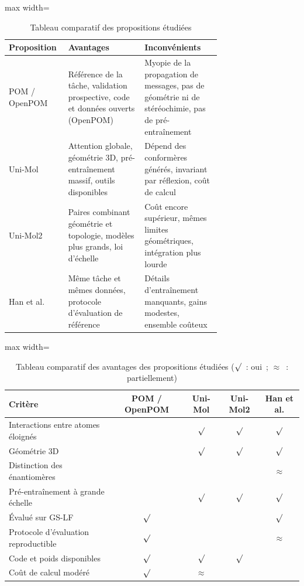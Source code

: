 \begin{table}
   \centering
   \begin{adjustbox}{max width=\linewidth}
   \begin{tabular}{|l||p{0.36\linewidth}|p{0.36\linewidth}|}
      \hline
      Proposition & Avantages & Inconvénients \\
      \hline
      \hline
      POM / OpenPOM & Référence de la tâche, validation prospective, code et données ouverts (OpenPOM) & Myopie de la propagation de messages, pas de géométrie ni de stéréochimie, pas de pré-entraînement \\
      \hline
      Uni-Mol & Attention globale, géométrie 3D, pré-entraînement massif, outils disponibles & Dépend des conformères générés, invariant par réflexion, coût de calcul \\
      \hline
      Uni-Mol2 & Paires combinant géométrie et topologie, modèles plus grands, loi d'échelle & Coût encore supérieur, mêmes limites géométriques, intégration plus lourde \\
      \hline
      Han et al. & Même tâche et mêmes données, protocole d'évaluation de référence & Détails d'entraînement manquants, gains modestes, ensemble coûteux \\
      \hline
   \end{tabular}
   \end{adjustbox}
   \caption{Tableau comparatif des propositions étudiées}
   \label{tab:Comparatif}
\end{table}

\begin{table}
   \centering
   \begin{adjustbox}{max width=\linewidth}
   \begin{tabular}{|l||c|c|c|c|}
      \hline
      Critère & POM / OpenPOM & Uni-Mol & Uni-Mol2 & Han et al. \\
      \hline
      \hline
      Interactions entre atomes éloignés & & $\surd$ & $\surd$ & $\surd$ \\
      \hline
      Géométrie 3D & & $\surd$ & $\surd$ & $\surd$ \\
      \hline
      Distinction des énantiomères & & & & $\approx$ \\
      \hline
      Pré-entraînement à grande échelle & & $\surd$ & $\surd$ & $\surd$ \\
      \hline
      Évalué sur GS-LF & $\surd$ & & & $\surd$ \\
      \hline
      Protocole d'évaluation reproductible & $\surd$ & & & $\approx$ \\
      \hline
      Code et poids disponibles & $\surd$ & $\surd$ & $\surd$ & \\
      \hline
      Coût de calcul modéré & $\surd$ & $\approx$ & & \\
      \hline
   \end{tabular}
   \end{adjustbox}
   \caption{Tableau comparatif des avantages des propositions étudiées ($\surd$~: oui~; $\approx$~: partiellement)}
   \label{tab:ComparatifAlternatif}
\end{table}

